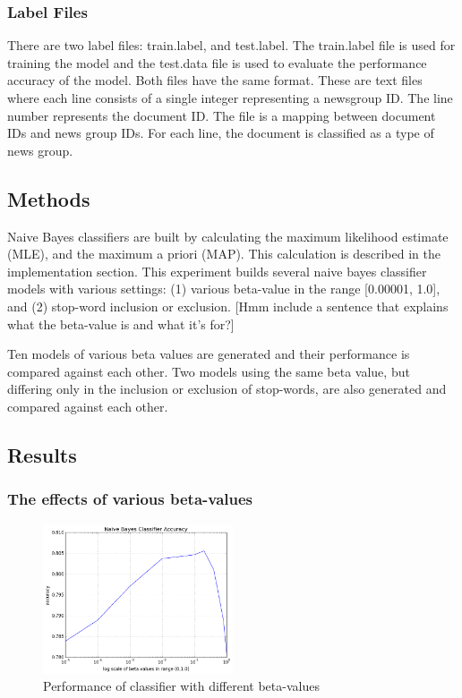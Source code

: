 \documentclass{IEEEtran}
\begin{document}
\subsubsection{Label Files}
There are two label files: train.label, and test.label. The train.label file is used for training the model and the test.data file is used to evaluate the performance accuracy of the model. Both files have the same format. These are text files where each line consists of a single integer representing a newsgroup ID. The line number represents the document ID. The file is a mapping between document IDs and news group IDs. For each line, the document is classified as a type of news group.


\subsection{Methods}
Naive Bayes classifiers are built by calculating the maximum likelihood estimate (MLE), and the maximum a priori (MAP). This calculation is described in the implementation section. This experiment builds several naive bayes classifier models with various settings: (1) various beta-value in the range [0.00001, 1.0], and (2) stop-word inclusion or exclusion. [Hmm include a sentence that explains what the beta-value is and what it's for?]

Ten models of various beta values are generated and their performance is compared against each other. Two models using the same beta value, but differing only in the inclusion or exclusion of stop-words, are also generated and compared against each other.

\subsection{Results}
\subsubsection{The effects of various beta-values}

\begin{figure}
  \includegraphics[width=0.5\textwidth, natwidth=80,natheight=80]{betavsacc.png}
  \caption{Performance of classifier with different beta-values}
  \label{fig:betavsacc}
\end{figure}
\end{document}
